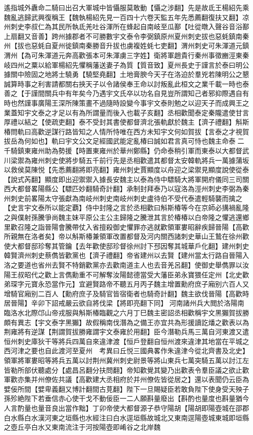 遙指城外纛命二騎曰出召大軍城中皆懾服莫敢動【懾之涉翻】先是故氐王楊紹先乘魏亂逃歸武興復稱王【魏執楊紹先見一百四十六卷天監五年先悉薦翻復扶又翻】凉州刺史李叔仁為其民所執氐羌吐谷渾所在蜂起自南岐至瓜鄯【吐從暾入聲谷音浴鄯上扇翻又音善】跨州據郡者不可勝數宇文泰令李弼鎮原州夏州刺史拔也惡蚝鎮南秦州【拔也惡蚝自夏州徙鎮南秦勝音升拔也虜複姓蚝七吏翻】渭州刺史可朱渾道元鎮渭州【為可朱渾道元奔高歡張本可朱渾虜三字姓】衛將軍趙貴行秦州事徵豳涇東秦岐四州之粟以給軍楊紹先懼稱藩送妻子為質【質音致】夏州長史于謹言於泰曰明公據關中險固之地將士驍勇【驍堅堯翻】土地膏腴今天子在洛迫於羣兇若陳明公之懇誠算時事之利害請都關右挾天子以令諸侯奉王命以討叛亂此桓文之業千載一時也泰善之【于謹間關兵中有年矣今乃遇宇文氏卒以功名自見豈所謂知己者邪抑際遇自有時也然謹事廣陽王深所陳策畫不過隨時設變今事宇文泰則勉之以迎天子而成興王之業蓋知宇文泰之才足以有為所謂量而後入也載子亥翻】丞相歡聞泰定秦隴遣使甘言厚禮以結之【使疏吏翻】泰不受封其書使都督濟北張軌獻於魏主【濟子禮翻】斛斯椿問軌曰高歡逆謀行路皆知之人情所恃唯在西方未知宇文何如賀拔【言泰之才視賀拔岳為何如也】軌曰宇文公文足經國武能定亂椿曰誠如君言真可恃也魏主命泰二千騎鎮東雍州助為勢援【時置東雍州於華州鄭縣】仍命泰稍引軍而東泰以大都督武川梁禦為雍州刺史使將步騎五千前行先是丞相歡遣其都督太安韓軌將兵一萬據蒲坂以救侯莫陳悦【先悉薦翻將即亮翻】雍州刺史賈顯度以舟迎之梁禦見顯度說使從泰【說式芮翻】顯度即出迎禦禦入據長安魏主以泰為侍中驃騎大將軍開府儀同三司關西大都督畧陽縣公【驃匹妙翻騎奇計翻】承制封拜泰乃以寇洛為涇州刺史李弼為秦州刺史前畧陽太守張獻為南岐州刺史南岐州刺史盧待伯不受代泰遣輕騎襲而擒之【史言宇文泰所以能定覇】侍中封隆之言於丞相歡曰斛斯椿等今在京師必搆禍亂隆之與僕射孫騰爭尚魏主妺平原公主公主歸隆之騰泄其言於椿椿以白帝隆之懼逃還鄉里歡召隆之詣晉陽會騰帶仗入省擅殺御史懼罪亦逃就歡領軍婁昭辭疾歸晉陽【高歡所親無在洛者矣】帝以斛斯椿兼領軍改置都督及河内關西諸刺史華山王鷙在徐州歡使大都督邸珍奪其管鑰【去年歡使邸珍督徐州討下邳因奪其城華戶化翻】建州刺史韓賢濟州刺史蔡儁皆歡黨也【濟子禮翻】帝省建州以去賢【建州當太行路自晉陽入洛之要道也省州去賢不特銷歡黨亦去歡南道主人也去音羌呂翻】使御史舉儁罪以汝陽王叔昭代之歡上言儁勳重不可解奪汝陽懿德當受大藩臣弟永寶猥任定州【北史歡弟琛字元寶永恐當作元】宜避賢路帝不聽五月丙子魏主增置勳府庶子廂别六百人又增騎官廂别二百人【勳府庶子及騎官皆宿衛者也騎奇計翻】魏主欲伐晉陽【高歡時居晉陽】辛卯下詔戒嚴云欲自將伐梁【將即亮翻下同】河南諸州兵大閲於洛陽南臨洛水北際邙山帝戎服與斛斯椿臨觀之六月丁巳魏主密詔丞相歡稱宇文黑獺賀拔勝頗有異志【宇文泰字黑獺】故假稱南伐潛為之備王亦宜共為形援讀訖燔之歡表以為荆雍將有逆謀【荆謂賀拔勝雍謂宇文泰雍於用翻】臣今潛勒兵馬三萬自河東渡又遣恒州刺史庫狄干等將兵四萬自來違津渡【恒戶登翻自恒州渡來違津其地當在平城之西河津之要也自此渡河至夏州　考異曰丘悦三國典畧作朱違津今從北齊書及北史】領軍將軍婁昭等將兵五萬以討荆州冀州刺史尉景等將山東兵七萬突騎五萬以討江左皆勒所部伏聽處分【處昌呂翻分扶問翻】帝知歡覺其變乃出歡表令羣臣議之欲止歡軍歡亦集并州僚佐共議【高歡建大丞相府於并州僚佐皆從居之】還以表聞仍云臣為嬖佞所間【嬖卑義翻又博計翻間古莧翻】陛下一旦賜疑臣若敢負陛下使身受天殃子孫殄絶陛下若垂信赤心使干戈不動佞臣一二人願斟量廢出【斟酌也量度也斟量猶今人言酌量也量音良出當作黜】丁卯帝使大都督源子恭守陽胡【陽胡即陽壺城在邵郡白水縣白水漢河東之垣縣也水經注曰白水逕垣縣故城北又東南逕陽壺城東城即垣縣之壺丘亭白水又東南流注于河按陽壺即崤谷之北岸魏